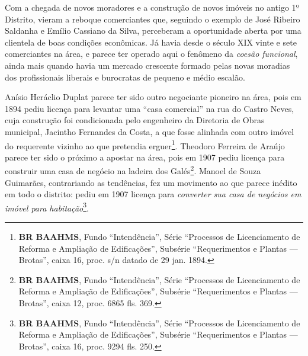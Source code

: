
Com a chegada de novos moradores e a construção de novos imóveis no antigo 1º Distrito, vieram a reboque comerciantes que, seguindo o exemplo de José Ribeiro Saldanha e Emílio Cassiano da Silva, perceberam a oportunidade aberta por uma clientela de boas condições econômicas. Já havia desde o século XIX vinte e sete comerciantes na área, e parece ter operado aqui o fenômeno da \textit{coesão funcional}, ainda mais quando havia um mercado crescente formado pelas novas moradias dos profissionais liberais e burocratas de pequeno e médio escalão.

Anísio Heráclio Duplat parece ter sido outro negociante pioneiro na área, pois em 1894 pediu licença para levantar uma ``casa comercial'' na rua do Castro Neves, cuja construção foi condicionada pelo engenheiro da Diretoria de Obras municipal, Jacintho Fernandes da Costa, a que fosse alinhada com outro imóvel do requerente vizinho ao que pretendia erguer\footnote{\textbf{BR BAAHMS}, Fundo ``Intendência'', Série ``Processos de Licenciamento de Reforma e Ampliação de Edificações'', Subsérie ``Requerimentos e Plantas --- Brotas'', caixa 16, proc. s/n datado de 29 jan. 1894.}. Theodoro Ferreira de Araújo parece ter sido o próximo a apostar na área, pois em 1907 pediu licença para construir uma casa de negócio na ladeira dos Galés\footnote{\textbf{BR BAAHMS}, Fundo ``Intendência'', Série ``Processos de Licenciamento de Reforma e Ampliação de Edificações'', Subsérie ``Requerimentos e Plantas --- Brotas'', caixa 12, proc. 6865 fls. 369.}. Manoel de Souza Guimarães, contrariando as tendências, fez um movimento ao que parece inédito em todo o distrito: pediu em 1907 licença para \textit{converter sua casa de negócios em imóvel para habitação}\footnote{\textbf{BR BAAHMS}, Fundo ``Intendência'', Série ``Processos de Licenciamento de Reforma e Ampliação de Edificações'', Subsérie ``Requerimentos e Plantas --- Brotas'', caixa 16, proc. 9294 fls. 250.}.

